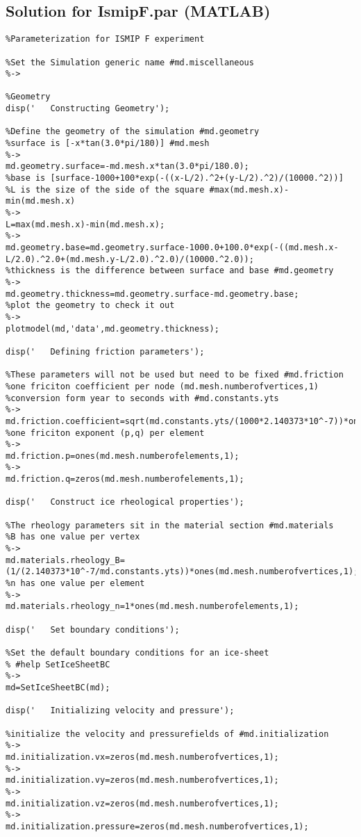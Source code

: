 \subsection{Solution for IsmipF.par (MATLAB)}%
\begin{verbatim}%Parameterization for ISMIP F experiment

%Set the Simulation generic name #md.miscellaneous
%->

%Geometry
disp('   Constructing Geometry');

%Define the geometry of the simulation #md.geometry
%surface is [-x*tan(3.0*pi/180)] #md.mesh
%->
md.geometry.surface=-md.mesh.x*tan(3.0*pi/180.0);
%base is [surface-1000+100*exp(-((x-L/2).^2+(y-L/2).^2)/(10000.^2))]
%L is the size of the side of the square #max(md.mesh.x)-min(md.mesh.x)
%->
L=max(md.mesh.x)-min(md.mesh.x);
%->
md.geometry.base=md.geometry.surface-1000.0+100.0*exp(-((md.mesh.x-L/2.0).^2.0+(md.mesh.y-L/2.0).^2.0)/(10000.^2.0));
%thickness is the difference between surface and base #md.geometry
%->
md.geometry.thickness=md.geometry.surface-md.geometry.base;
%plot the geometry to check it out
%->
plotmodel(md,'data',md.geometry.thickness);

disp('   Defining friction parameters');

%These parameters will not be used but need to be fixed #md.friction
%one friciton coefficient per node (md.mesh.numberofvertices,1)
%conversion form year to seconds with #md.constants.yts
%->
md.friction.coefficient=sqrt(md.constants.yts/(1000*2.140373*10^-7))*ones(md.mesh.numberofvertices,1);
%one friciton exponent (p,q) per element
%->
md.friction.p=ones(md.mesh.numberofelements,1);
%->
md.friction.q=zeros(md.mesh.numberofelements,1);

disp('   Construct ice rheological properties');

%The rheology parameters sit in the material section #md.materials
%B has one value per vertex
%->
md.materials.rheology_B=(1/(2.140373*10^-7/md.constants.yts))*ones(md.mesh.numberofvertices,1);
%n has one value per element
%->
md.materials.rheology_n=1*ones(md.mesh.numberofelements,1);

disp('   Set boundary conditions');

%Set the default boundary conditions for an ice-sheet
% #help SetIceSheetBC
%->
md=SetIceSheetBC(md);

disp('   Initializing velocity and pressure');

%initialize the velocity and pressurefields of #md.initialization
%->
md.initialization.vx=zeros(md.mesh.numberofvertices,1);
%->
md.initialization.vy=zeros(md.mesh.numberofvertices,1);
%->
md.initialization.vz=zeros(md.mesh.numberofvertices,1);
%->
md.initialization.pressure=zeros(md.mesh.numberofvertices,1);\end{verbatim}
